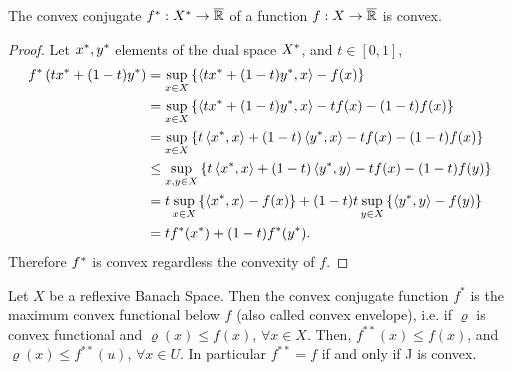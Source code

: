 \begin{proposition}
	The convex conjugate ${f}^*:{X}^*\rightarrow \overline{\mathbb{R}}$ of a function $f:X\rightarrow\overline{\mathbb{R}}$ is convex.
	\begin{proof}
		Let ${x}^*, {y}^*$ elements of the dual space ${X}^*$, and $t\in[0,1]$,
		\begin{align*}
			{f}^*\left( t{x}^*+(1-t){y}^* \right)&=\sup_{x\in X}\left\lbrace \left\langle t{x}^*+(1-t){y}^*, x \right\rangle-f(x) \right\rbrace \\
			&=\sup_{x\in X}\left\lbrace \left\langle t{x}^*+(1-t){y}^*, x \right\rangle-tf(x)-(1-t)f(x) \right\rbrace\\
			&=\sup_{x\in X}\left\lbrace t\left\langle {x}^*, x \right\rangle+(1-t)\left\langle {y}^*, x \right\rangle-tf(x)-(1-t)f(x) \right\rbrace\\
			&\leq \sup_{x, y \in X} \left\lbrace t\left\langle {x}^*, x \right\rangle+(1-t)\left\langle {y}^*, y \right\rangle-tf(x)-(1-t)f(y) \right\rbrace\\
			&=t\sup_{x \in X} \left\lbrace \left\langle {x}^*, x \right\rangle-f(x) \right\rbrace+(1-t)t\sup_{y \in X} \left\lbrace \left\langle {y}^*, y \right\rangle-f(y) \right\rbrace\\
			&=t{f}^*({x}^*)+(1-t){f}^*({y}^*).
		\end{align*}
		Therefore ${f}^*$ is convex regardless the convexity of $f$.
	\end{proof}
\end{proposition}


	
\begin{theorem}
	Let $X$ be a reflexive Banach Space. Then the convex conjugate function $f^*$ is the maximum convex functional below $f$ (also called convex envelope), i.e. if $\varrho$ is convex functional and $\varrho(x)\leq f(x)$, $\forall x \in X$. Then, $f^{**}(x)\leq f(x)$, and $\varrho(x)\leq f^{**}(u)$, $\forall x \in U $. In particular $f^{**} = f$ if and only if J is convex.
\end{theorem}

